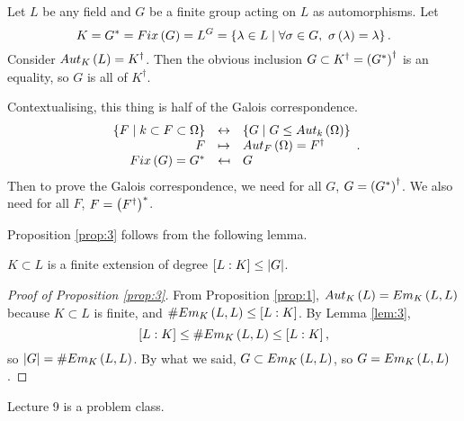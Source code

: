\begin{proposition}
\label{prop:3}
Let $ L $ be any field and $ G $ be a finite group acting on $ L $ as automorphisms. Let
$$ K = G^* = Fix\left( G \right) = L^G = \left\{ \lambda \in L \mid \forall \sigma \in G, \ \sigma\left( \lambda \right) = \lambda \right\}. $$
Consider $ Aut_K\left( L \right) = K^\dagger $. Then the obvious inclusion $ G \subset K^\dagger = \left( G^* \right)^\dagger $ is an equality, so $ G $ is all of $ K^\dagger $.
\end{proposition}

\begin{remark*}
Contextualising, this thing is half of the Galois correspondence.
$$
\begin{array}{rcl}
\left\{ F \mid k \subset F \subset \Omega \right\} & \leftrightarrow & \left\{ G \mid G \le Aut_k\left( \Omega \right) \right\} \\
F & \mapsto & Aut_F\left( \Omega \right) = F^\dagger \\
Fix\left( G \right) = G^* & \mapsfrom & G
\end{array}.
$$
Then to prove the Galois correspondence, we need for all $ G $, $ G = \left( G^* \right)^\dagger $. We also need for all $ F $, $ F = \left( F^\dagger \right)^* $.
\end{remark*}

Proposition \ref{prop:3} follows from the following lemma.

\begin{lemma}
\label{lem:3}
$ K \subset L $ is a finite extension of degree $ \left[ L : K \right] \le \left\lvert G \right\rvert $.
\end{lemma}

\begin{proof}[Proof of Proposition \ref{prop:3}]
From Proposition \ref{prop:1}, $ Aut_K\left( L \right) = Em_K\left( L, L \right) $ because $ K \subset L $ is finite, and $ \#Em_K\left( L, L \right) \le \left[ L : K \right] $. By Lemma \ref{lem:3},
$$ \left[ L : K \right] \le \#Em_K\left( L, L \right) \le \left[ L : K \right], $$
so $ \left\lvert G \right\rvert = \#Em_K\left( L, L \right) $. By what we said, $ G \subset Em_K\left( L, L \right) $, so $ G = Em_K\left( L, L \right) $.
\end{proof}


Lecture 9 is a problem class.


